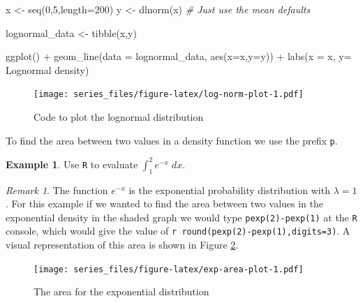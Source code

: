 \documentclass[
]{book}
\newenvironment{Shaded}{\begin{snugshade}}{\end{snugshade}}
\newcommand{\AttributeTok}[1]{\textcolor[rgb]{0.77,0.63,0.00}{#1}}
\newcommand{\CommentTok}[1]{\textcolor[rgb]{0.56,0.35,0.01}{\textit{#1}}}
\newcommand{\DecValTok}[1]{\textcolor[rgb]{0.00,0.00,0.81}{#1}}
\newcommand{\FunctionTok}[1]{\textcolor[rgb]{0.00,0.00,0.00}{#1}}
\newcommand{\NormalTok}[1]{#1}
\newcommand{\OtherTok}[1]{\textcolor[rgb]{0.56,0.35,0.01}{#1}}
\newcommand{\SpecialCharTok}[1]{\textcolor[rgb]{0.00,0.00,0.00}{#1}}
\newcommand{\StringTok}[1]{\textcolor[rgb]{0.31,0.60,0.02}{#1}}
\theoremstyle{definition}
\theoremstyle{definition}
\newtheorem{example}{Example}[chapter]
\theoremstyle{definition}
\theoremstyle{remark}
\newtheorem*{remark}{Remark}
\begin{document}
\begin{Shaded}
\begin{Highlighting}[]
\NormalTok{x }\OtherTok{\textless{}{-}} \FunctionTok{seq}\NormalTok{(}\DecValTok{0}\NormalTok{,}\DecValTok{5}\NormalTok{,}\AttributeTok{length=}\DecValTok{200}\NormalTok{)}
\NormalTok{y }\OtherTok{\textless{}{-}} \FunctionTok{dlnorm}\NormalTok{(x)  }\CommentTok{\# Just use the mean defaults }

\NormalTok{lognormal\_data }\OtherTok{\textless{}{-}} \FunctionTok{tibble}\NormalTok{(x,y)}

\FunctionTok{ggplot}\NormalTok{() }\SpecialCharTok{+}
  \FunctionTok{geom\_line}\NormalTok{(}\AttributeTok{data =}\NormalTok{ lognormal\_data,}
             \FunctionTok{aes}\NormalTok{(}\AttributeTok{x=}\NormalTok{x,}\AttributeTok{y=}\NormalTok{y)) }\SpecialCharTok{+}
  \FunctionTok{labs}\NormalTok{(}\AttributeTok{x =} \StringTok{\textquotesingle{}x\textquotesingle{}}\NormalTok{, }\AttributeTok{y=} \StringTok{\textquotesingle{}Lognormal density\textquotesingle{}}\NormalTok{)}
\end{Highlighting}
\end{Shaded}

\begin{figure}
\centering
\texttt{[image: series\_files/figure-latex/log-norm-plot-1.pdf]}
\caption{\label{fig:log-norm-plot}Code to plot the lognormal distribution}
\end{figure}

To find the area between two values in a density function we use the prefix \texttt{p}.

\begin{example}
\protect\hypertarget{exm:exp-area}{}{\label{exm:exp-area} }Use \texttt{R} to evaluate \(\displaystyle \int_{1}^{2} e^{-x} \; dx\).
\end{example}

\begin{remark}
{}The function \(e^{-x}\) is the exponential probability distribution with \(\lambda=1\). For this example if we wanted to find the area between two values in the exponential density in the shaded graph we would type \texttt{pexp(2)-pexp(1)} at the \texttt{R} console, which would give the value of \texttt{r\ round(pexp(2)-pexp(1),digits=3)}. A visual representation of this area is shown in Figure \ref{fig:exp-area-plot}.
\end{remark}

\begin{figure}
\centering
\texttt{[image: series\_files/figure-latex/exp-area-plot-1.pdf]}
\caption{\label{fig:exp-area-plot}The area for the exponential distribution}
\end{figure}
\end{document}
